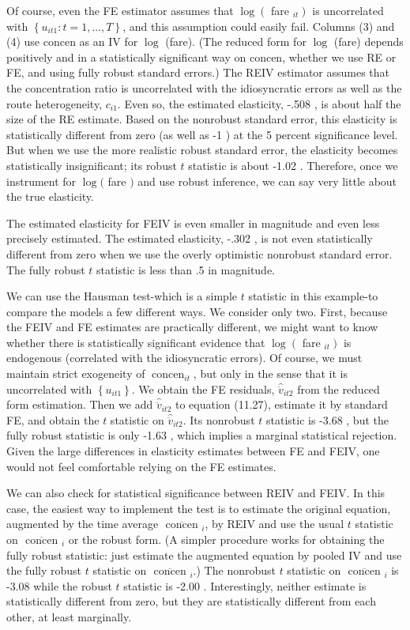 \documentclass[10pt]{article}
\begin{document}
Of course, even the FE estimator assumes that $\log \left(\right.$ fare $\left._{i t}\right)$ is uncorrelated with $\left\{u_{i t 1}: t=1, \ldots, T\right\}$, and this assumption could easily fail. Columns (3) and (4) use concen as an IV for $\log$ (fare). (The reduced form for $\log$ (fare) depends positively and in a statistically significant way on concen, whether we use RE or FE, and using fully robust standard errors.) The REIV estimator assumes that the concentration ratio is uncorrelated with the idiosyncratic errors as well as the route heterogeneity, $c_{i 1}$. Even so, the estimated elasticity, -.508 , is about half the size of the RE estimate. Based on the nonrobust standard error, this elasticity is statistically different from zero (as well as -1 ) at the 5 percent significance level. But when we use the more realistic robust standard error, the elasticity becomes statistically insignificant; its robust $t$ statistic is about -1.02 . Therefore, once we instrument for $\log ($ fare $)$ and use robust inference, we can say very little about the true elasticity.

The estimated elasticity for FEIV is even smaller in magnitude and even less precisely estimated. The estimated elasticity, -.302 , is not even statistically different from zero when we use the overly optimistic nonrobust standard error. The fully robust $t$ statistic is less than .5 in magnitude.

We can use the Hausman test-which is a simple $t$ statistic in this example-to compare the models a few different ways. We consider only two. First, because the FEIV and FE estimates are practically different, we might want to know whether there is statistically significant evidence that $\log \left(\right.$ fare $\left._{i t}\right)$ is endogenous (correlated with the idiosyncratic errors). Of course, we must maintain strict exogeneity of $\operatorname{concen}_{i t}$, but only in the sense that it is uncorrelated with $\left\{u_{i t 1}\right\}$. We obtain the FE residuals, $\hat{\ddot{v}}_{i t 2}$ from the reduced form estimation. Then we add $\hat{\ddot{v}}_{i t 2}$ to equation (11.27), estimate it by standard FE, and obtain the $t$ statistic on $\hat{\ddot{v}}_{i t 2}$. Its nonrobust $t$ statistic is -3.68 , but the fully robust statistic is only -1.63 , which implies a marginal statistical rejection. Given the large differences in elasticity estimates between FE and FEIV, one would not feel comfortable relying on the FE estimates.

We can also check for statistical significance between REIV and FEIV. In this case, the easiest way to implement the test is to estimate the original equation, augmented by the time average $\overline{\text { concen }}_{i}$, by REIV and use the usual $t$ statistic on $\overline{\text { concen }}_{i}$ or the robust form. (A simpler procedure works for obtaining the fully robust statistic: just estimate the augmented equation by pooled IV and use the fully robust $t$ statistic on $\overline{\text { concen }}_{i}$.) The nonrobust $t$ statistic on $\overline{\text { concen }}_{i}$ is -3.08 while the robust $t$ statistic is -2.00 . Interestingly, neither estimate is statistically different from zero, but they are statistically different from each other, at least marginally.
\end{document}
